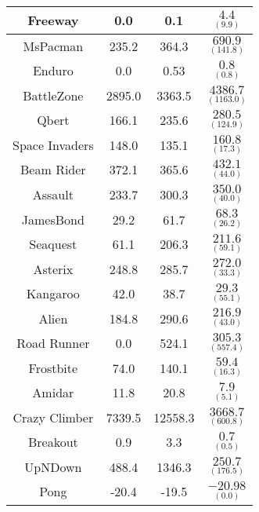 \documentclass{article}
\begin{document}
\begin{table}[h]
\begin{tabular}{|c|c|c|c|}
Freeway        & 0.0             & 0.1              &$\underset{(9.9)}{4.4}$             \\ \hline
MsPacman       & 235.2           & 364.3            &$\underset{(141.8)}{690.9}$      \\ \hline
Enduro         & 0.0             & 0.53              &$\underset{(0.8)}{0.8}$         \\ \hline
BattleZone          & 2895.0           & 3363.5            &$\underset{(1163.0)}{4386.7}$    \\ \hline
Qbert          & 166.1           & 235.6            &$\underset{(124.9)}{280.5}$        \\ \hline
Space Invaders & 148.0           & 135.1            &$\underset{(17.3)}{160.8}$         \\ \hline
Beam Rider     & 372.1           & 365.6            &$\underset{(44.0)}{432.1}$      \\ \hline
Assault          & 233.7           & 300.3            &$\underset{(40.0)}{350.0}$         \\ \hline
JamesBond           & 29.2           & 61.7            &$\underset{(26.2)}{68.3}$       \\ \hline
Seaquest       & 61.1            & 206.3            &$\underset{(59.1)}{211.6}$            \\ \hline
Asterix        & 248.8           & 285.7            &$\underset{(33.3)}{272.0}$      \\ \hline
Kangaroo        & 42.0             & 38.7              &$\underset{(55.1)}{29.3}$           \\ \hline
Alien          & 184.8           & 290.6            &$\underset{(43.0)}{216.9}$           \\ \hline
Road Runner    & 0.0             & 524.1            &$\underset{(557.4)}{305.3}$       \\ \hline
Frostbite      & 74.0            & 140.1            &$\underset{(16.3)}{59.4}$       \\ \hline
Amidar         & 11.8            & 20.8             &$\underset{(5.1)}{7.9}$            \\ \hline
Crazy Climber  & 7339.5          & 12558.3          &$\underset{(600.8)}{3668.7}$    \\ \hline
Breakout       & 0.9             & 3.3              &$\underset{(0.5)}{0.7}$              \\ \hline
UpNDown         & 488.4            & 1346.3             &$\underset{(176.5)}{250.7}$          \\ \hline
Pong           & -20.4           & -19.5            &$\underset{(0.0)}{-20.98}$          \\ \hline


\end{tabular}
\egroup

\end{table}
\end{document}
